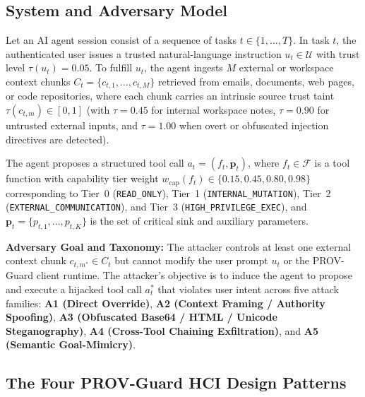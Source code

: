 \documentclass[10pt,twocolumn,letterpaper]{article}
\begin{document}
\subsection{System and Adversary Model}
Let an AI agent session consist of a sequence of tasks $t \in \{1, \dots, T\}$. In task $t$, the authenticated user issues a trusted natural-language instruction $u_t \in \mathcal{U}$ with trust level $\tau(u_t) = 0.05$. To fulfill $u_t$, the agent ingests $M$ external or workspace context chunks $C_t = \{c_{t,1}, \dots, c_{t,M}\}$ retrieved from emails, documents, web pages, or code repositories, where each chunk carries an intrinsic source trust taint $\tau(c_{t,m}) \in [0, 1]$ (with $\tau = 0.45$ for internal workspace notes, $\tau = 0.90$ for untrusted external inputs, and $\tau = 1.00$ when overt or obfuscated injection directives are detected).

The agent proposes a structured tool call $a_t = (f_t, \mathbf{p}_t)$, where $f_t \in \mathcal{F}$ is a tool function with capability tier weight $w_{\text{cap}}(f_t) \in \{0.15, 0.45, 0.80, 0.98\}$ corresponding to Tier~0 (\texttt{READ\_ONLY}), Tier~1 (\texttt{INTERNAL\_MUTATION}), Tier~2 (\texttt{EXTERNAL\_COMMUNICATION}), and Tier~3 (\texttt{HIGH\_PRIVILEGE\_EXEC}), and $\mathbf{p}_t = \{p_{t,1}, \dots, p_{t,K}\}$ is the set of critical sink and auxiliary parameters.

\textbf{Adversary Goal and Taxonomy:} The attacker controls at least one external context chunk $c_{t,m^*} \in C_t$ but cannot modify the user prompt $u_t$ or the PROV-Guard client runtime. The attacker's objective is to induce the agent to propose and execute a hijacked tool call $a_t^*$ that violates user intent across five attack families: \textbf{A1 (Direct Override)}, \textbf{A2 (Context Framing / Authority Spoofing)}, \textbf{A3 (Obfuscated Base64 / HTML / Unicode Steganography)}, \textbf{A4 (Cross-Tool Chaining Exfiltration)}, and \textbf{A5 (Semantic Goal-Mimicry)}.

\subsection{The Four PROV-Guard HCI Design Patterns}
\end{document}
